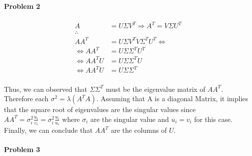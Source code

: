 \documentclass[11pt]{article}
\begin{document}
\paragraph{\noindent\textbf{\LARGE{Problem 2}}}

\begin{equation*}
\begin{split}
A & =  U \Sigma V^T \Rightarrow A^T = V \Sigma U^T \\ \therefore{}\\
A A^T & = U \Sigma V^T V \Sigma ^T U^T \Leftrightarrow \\
\Leftrightarrow A A^T & = U \Sigma \Sigma^T U^T \\
\Leftrightarrow A A^T U & = U \Sigma \Sigma^T U \\
\Leftrightarrow A A^T U & = U \Sigma \Sigma^T \\
\end{split}
\end{equation*}

\begin{flushleft}
    Thus, we can observed that $\Sigma \Sigma^T$ must be the eigenvalue matrix of $A A^T$.
    Therefore each $\sigma ^2 = \lambda(A^T A)$.\newline\newline
    Assuming that A is a diagonal Matrix, it implies that the square root of eigenvalues are the singular values since
    $A A^T = \sigma_i^2 \frac{u_i}{v_i} = \sigma_i^2 \frac{u_i}{u_i}$ where $\sigma_i$ are the singular value and $u_i = v_i$ for this case. \newline\newline
    Finally, we can conclude that $A A^T$ are the columns of $U$.
\end{flushleft}

\paragraph{\noindent\textbf{\LARGE{Problem 3}}}
\end{document}
